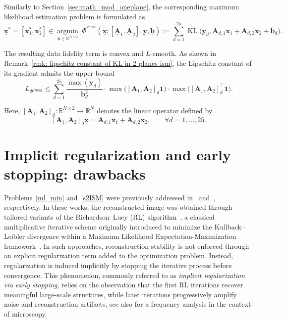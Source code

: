 \documentclass[letterpaper]{article}
\newcommand{\x}{\mathbf{x}}
\begin{document}
Similarly to Section~\ref{sec:math_mod_oneplane}, the corresponding maximum likelihood estimation problem is formulated as
\begin{equation}
\label{s2ISM}
\underline{\x}^*
=
[\x_1^*,\x_2^*]
\in
\operatorname*{argmin}_{\underline{\x}\in\mathbb{R}^{N\times 2}}
~
\Phi^{^{\text{$s^2$ISM}}}
(
\underline{\x};
[\underline{\mathbf{A}}_1,\underline{\mathbf{A}}_2],
\underline{\mathbf{y}},
\underline{\mathbf{b}}
)
:=
\sum_{d=1}^{25}
\operatorname{KL}
\bigl(
\mathbf{y}_d,
\mathbf{A}_{d,1}\mathbf{x}_1
+
\mathbf{A}_{d,2}\mathbf{x}_2
+
\mathbf{b}_d
\bigr).
\end{equation}

The resulting data fidelity term is convex and $L$-smooth. As shown in Remark~\ref{rmk: lipschitz constant of KL in 2 planes ism}, the Lipschitz constant of its gradient admits the upper bound
\begin{equation}
L_{\Phi{^{\text{$s^2$ISM}}}}
\leq
\sum_{d=1}^{25}
\frac{\max(\mathbf{y}_d)}{\mathbf{b}_d^2}
\cdot
\max\bigl([\mathbf{A}_1,\mathbf{A}_2]_d\mathbf{1}\bigr)
\cdot
\max\bigl([\mathbf{A}_1,\mathbf{A}_2]_d^\top\mathbf{1}\bigr).
\end{equation}

Here,
$
[\mathbf{A}_1,\mathbf{A}_2]_d :
\mathbb{R}^{N\times 2}
\to
\mathbb{R}^N
$
denotes the linear operator defined by
\[
[\mathbf{A}_1,\mathbf{A}_2]_d \underline{\mathbf{x}}
=
\mathbf{A}_{d,1}\mathbf{x}_1
+
\mathbf{A}_{d,2}\mathbf{x}_2,
\qquad
\forall d=1,\dots,25.
\]



\section{Implicit regularization and early stopping: drawbacks}
\label{sec: implicit reg and early stopping}

Problems~\eqref{ml_min} and~\eqref{s2ISM} were previously addressed in~\cite{Zunino_2023} and~\cite{s2ISM}, respectively. In these works, the reconstructed image was obtained through tailored variants of the Richardson--Lucy (RL) algorithm~\cite{Richardson72,Lucy1974}, a classical multiplicative iterative scheme originally introduced to minimize the Kullback--Leibler divergence within a Maximum Likelihood Expectation-Maximization framework~\cite{Shepp1982}.
 In such approaches, reconstruction stability is not enforced through an explicit regularization term added to the optimization problem. Instead, regularization is induced implicitly by stopping the iterative process before convergence. This phenomenon, commonly referred to as \emph{implicit regularization via early stopping}, relies on the observation that the first RL iterations recover meaningful large-scale structures, while later iterations progressively amplify noise and reconstruction artifacts, see also \cite{Liu} for a frequency analysis in the context of microscopy.
\end{document}
